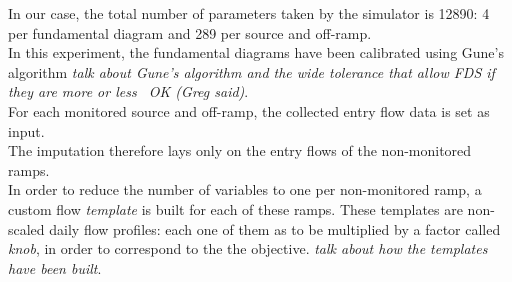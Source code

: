 In our case, the total number of parameters taken by the simulator is 12890: 4 per fundamental diagram and 289 per source and off-ramp.\\
In this experiment, the fundamental diagrams have been calibrated using Gune's algorithm \emph{talk about Gune's algorithm and the wide tolerance that allow FDS if they are more or less ~OK \color{red}(Greg said)\color{black}}.\\
For each monitored source and off-ramp, the collected entry flow data is set as input.\\
The imputation therefore lays only on the entry flows of the non-monitored ramps.\\
In order to reduce the number of variables to one per non-monitored ramp, a custom flow \emph{template} is built for each of these ramps. These templates are non-scaled daily flow profiles: each one of them as to be multiplied by a factor called \emph{knob}, in order to correspond to the the objective. \emph{talk about how the templates have been built}.

 